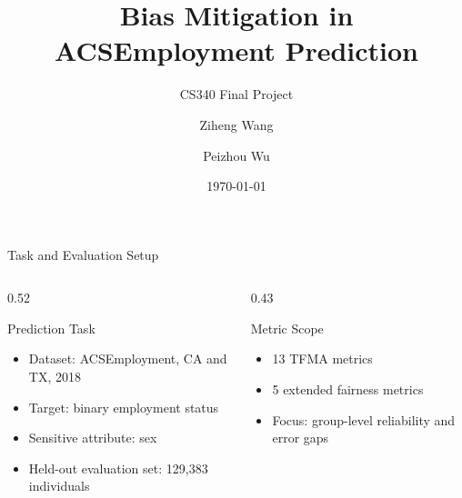 \documentclass[10pt,aspectratio=169]{beamer}
\title[Bias Mitigation]{Bias Mitigation in ACSEmployment Prediction}
\subtitle{CS340 Final Project}
\author{Ziheng Wang \and Peizhou Wu}
\date{\today}
\begin{document}
\begin{frame}
  \titlepage
\end{frame}

\begin{frame}{Task and Evaluation Setup}
  \begin{columns}[T,onlytextwidth]
    \begin{column}{0.52\textwidth}
      \begin{block}{Prediction Task}
        \begin{itemize}
          \item Dataset: ACSEmployment, CA and TX, 2018
          \item Target: binary employment status
          \item Sensitive attribute: sex
          \item Held-out evaluation set: 129,383 individuals
        \end{itemize}
      \end{block}
    \end{column}
    \begin{column}{0.43\textwidth}
      \begin{block}{Metric Scope}
        \begin{itemize}
          \item 13 TFMA metrics
          \item 5 extended fairness metrics
          \item Focus: group-level reliability and error gaps
        \end{itemize}
      \end{block}
    \end{column}
  \end{columns}

  \vspace{0.5em}
  \begin{center}
  \end{center}
\end{frame}
\end{document}

